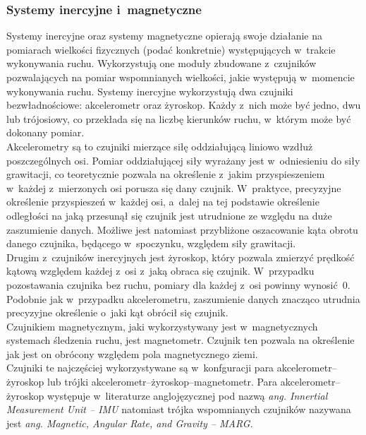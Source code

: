 \subsubsection*{Systemy inercyjne i~magnetyczne}\label{chap:mocaps:IMU}
Systemy inercyjne oraz systemy magnetyczne opierają swoje działanie na pomiarach wielkości fizycznych (podać konkretnie) występujących w~trakcie wykonywania ruchu. Wykorzystują one moduły zbudowane z~czujników pozwalających na pomiar wspomnianych wielkości, jakie występują w~momencie wykonywania ruchu. Systemy inercyjne wykorzystują dwa czujniki bezwładnościowe: akcelerometr oraz żyroskop. Każdy z~nich może być jedno, dwu lub trójosiowy, co przekłada się na liczbę kierunków ruchu, w~którym może być dokonany pomiar.\\
Akcelerometry są to czujniki mierzące siłę oddziałującą liniowo wzdłuż poszczególnych osi. Pomiar oddziałującej siły wyrażany jest w~odniesieniu do siły grawitacji, co teoretycznie pozwala na określenie z~jakim przyspieszeniem w~każdej z~mierzonych osi porusza się dany czujnik. W~praktyce, precyzyjne określenie przyspieszeń w~każdej osi, a~dalej na tej podstawie określenie odległości na jaką przesunął się czujnik jest utrudnione ze względu na duże zaszumienie danych. Możliwe jest natomiast przybliżone oszacowanie kąta obrotu danego czujnika, będącego w~spoczynku, względem siły grawitacji.\\
Drugim z~czujników inercyjnych jest żyroskop, który pozwala zmierzyć prędkość kątową względem każdej z~osi z~jaką obraca się czujnik. W~przypadku pozostawania czujnika bez ruchu, pomiary dla każdej z~osi powinny wynosić~0. Podobnie jak w~przypadku akcelerometru, zaszumienie danych znacząco utrudnia precyzyjne określenie o~jaki kąt obrócił się czujnik.\\
Czujnikiem magnetycznym, jaki wykorzystywany jest w~magnetycznych systemach śledzenia ruchu, jest magnetometr. Czujnik ten pozwala na określenie jak jest on obrócony względem pola magnetycznego ziemi.\\
Czujniki te najczęściej wykorzystywane są w~konfguracji para akcelerometr--żyroskop lub trójki akcelerometr--żyroskop--magnetometr. Para akcelerometr--żyroskop występuje w~literaturze anglojęzycznej pod nazwą \emph{ang. Innertial Measurement Unit -- IMU} natomiast trójka wspomnianych czujników nazywana jest \emph{ang. Magnetic, Angular Rate, and Gravity -- MARG}.\\
